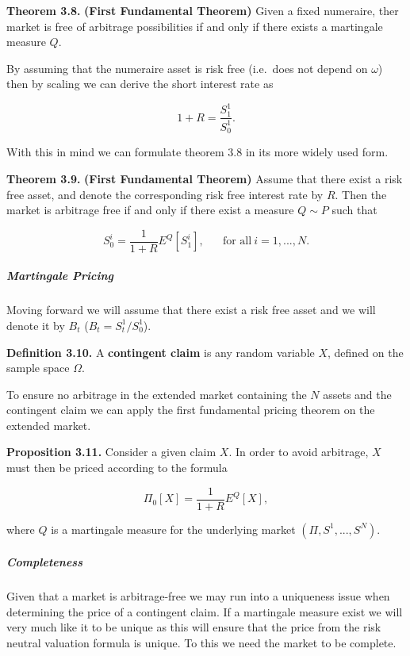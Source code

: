 \documentclass[
]{article}
\begin{document}
\textbf{Theorem 3.8.} \textbf{(First Fundamental Theorem)} Given a fixed
numeraire, ther market is free of arbitrage possibilities if and only if
there exists a martingale measure \(Q\).

By assuming that the numeraire asset is risk free (i.e.~does not depend
on \(\omega\)) then by scaling we can derive the short interest rate as

\[
1+R=\frac{S_1^1}{S_0^1}.
\]

With this in mind we can formulate theorem 3.8 in its more widely used
form.

\textbf{Theorem 3.9.} \textbf{(First Fundamental Theorem)} Assume that
there exist a risk free asset, and denote the corresponding risk free
interest rate by \(R\). Then the market is arbitrage free if and only if
there exist a measure \(Q\sim P\) such that

\[
S_0^i=\frac{1}{1+R}E^Q[S_1^i],\hspace{20pt}\text{for all}\ i=1,...,N.\tag{3.9}
\]

\hypertarget{martingale-pricing}{%
\subparagraph{Martingale Pricing}\label{martingale-pricing}}

Moving forward we will assume that there exist a risk free asset and we
will denote it by \(B_t\) (\(B_t=S^1_t/S^1_0\)).

\textbf{Definition 3.10.} A \textbf{contingent claim} is any random
variable \(X\), defined on the sample space \(\Omega\).

To ensure no arbitrage in the extended market containing the \(N\)
assets and the contingent claim we can apply the first fundamental
pricing theorem on the extended market.

\textbf{Proposition 3.11.} Consider a given claim \(X\). In order to
avoid arbitrage, \(X\) must then be priced according to the formula

\[
\Pi_0[X]=\frac{1}{1+R}E^Q[X],\tag{3.10}
\]

where \(Q\) is a martingale measure for the underlying market
\((\Pi,S^1,...,S^N)\).

\hypertarget{completeness}{%
\subparagraph{Completeness}\label{completeness}}

Given that a market is arbitrage-free we may run into a uniqueness issue
when determining the price of a contingent claim. If a martingale
measure exist we will very much like it to be unique as this will ensure
that the price from the risk neutral valuation formula is unique. To
this we need the market to be complete.
\end{document}
